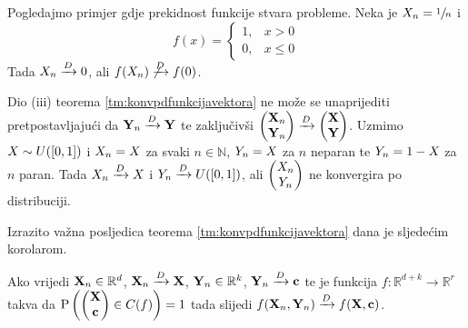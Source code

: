 \begin{primjer_}
	Pogledajmo primjer gdje prekidnost funkcije stvara probleme.
	Neka je $\tsvar{X}_n = \sfrac{1}{n}$ i 
	\[
		f(x) = 
		\begin{cases}
			1, & x>0 \\
			0, & x \leq 0
		\end{cases}
	\]
	Tada $\konvpd{\tsvar{X}_n}{0}$, ali $\nkonvpd{f(\tsvar{X}_n)}{f(0)}$.

\end{primjer_}

\begin{primjer_}
	Dio (iii) teorema \ref{tm:konvpdfunkcijavektora} ne može se
	unaprijediti pretpostavljajući da $\konvpd{\tsvek{Y}_n}{\tsvek{Y}}$ 
	te zaključivši
	$
	\konvpd{
		\begin{pmatrix}
			\tsvek{X}_n \\
			\tsvek{Y}_n \\
		\end{pmatrix}
	}{
		\begin{pmatrix}
			\tsvek{X} \\
			\tsvek{Y} \\
		\end{pmatrix}
	}
	$.
	Uzmimo $\tsvar{X} \sim U([0,1])$ i $\tsvar{X}_n=\tsvar{X}$
	za svaki $n \in \mathbb{N}$,
	$\tsvar{Y}_n = \tsvar{X}$ za $n$ neparan te $\tsvar{Y}_n=1-\tsvar{X}$
	za $n$ paran. Tada
	$\konvpd{\tsvar{X}_n}{\tsvar{X}}$ i 
	$\konvpd{\tsvar{Y}_n}{U([0,1])}$, ali
	$
		\begin{pmatrix}
			\tsvar{X}_n \\
			\tsvar{Y}_n \\
		\end{pmatrix}
	$
	ne konvergira po distribuciji.
\end{primjer_}

Izrazito važna posljedica teorema \ref{tm:konvpdfunkcijavektora}
dana je sljedećim korolarom.

\begin{kor}
	\label{kor:konvpdzajednickogvektora}
	Ako vrijedi $\tsvek{X}_n \in \mathbb{R}^d$,
	$\konvpd{\tsvek{X}_n}{\tsvek{X}}$,
	$\tsvek{Y}_n \in \mathbb{R}^k$, 
	$\konvpd{\tsvek{Y}_n}{\tv{c}}$
	te je funkcija $f:\mathbb{R}^{d+k} \rightarrow \mathbb{R}^r$
	takva da 
	$\vP \left(
		\begin{pmatrix}
			\tsvek{X} \\
			\tv{c} \\
		\end{pmatrix}
		\in C(f) \right) = 1$ tada slijedi 
	$\konvpd{f(\tsvek{X}_n,\tsvek{Y}_n)}{f(\tsvek{X},\tv{c})}$.
\end{kor}

